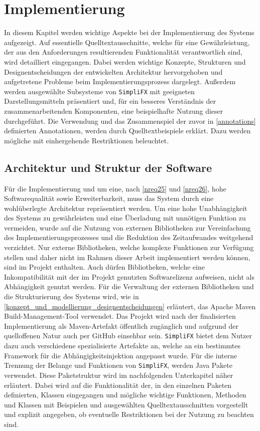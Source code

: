 \chapter{Implementierung}
\label{implementierung}
In diesem Kapitel werden wichtige Aspekte bei der Implementierung des Systems aufgezeigt. Auf essentielle Quelltextausschnitte, welche für eine Gewährleistung, der aus den Anforderungen resultierenden Funktionalität verantwortlich sind, wird detailliert eingegangen. Dabei werden wichtige Konzepte, Strukturen und Designentscheidungen der entwickelten Architektur hervorgehoben und aufgetretene Probleme beim Implementierungsprozess dargelegt. Außerdem werden ausgewählte Subsysteme von \texttt{SimpliFX} mit geeigneten Darstellungsmitteln präsentiert und, für ein besseres Verständnis der zusammenarbeitenden Komponenten, eine beispielhafte Nutzung dieser durchgeführt. Die Verwendung und das Zusammenspiel der zuvor in \autoref{annotations} definierten Annotationen, werden durch Quelltextbeispiele erklärt. Dazu werden mögliche mit einhergehende Restriktionen beleuchtet.
\section{Architektur und Struktur der Software}
\label{architektur}
Für die Implementierung und um eine, nach \autoref{nreq25} und \autoref{nreq26}, hohe Softwarequalität sowie Erweiterbarkeit, muss das System durch eine wohlüberlegte Architektur repräsentiert werden. Um eine hohe Unabhängigkeit des Systems zu gewährleisten und eine Überladung mit unnötigen Funktion zu vermeiden, wurde auf die Nutzung von externen Bibliotheken zur Vereinfachung des Implementierungsprozesses und die Reduktion des Zeitaufwandes weitgehend verzichtet. Nur externe Bibliotheken, welche komplexe Funktionen zur Verfügung stellen und daher nicht im Rahmen dieser Arbeit implementiert werden können, sind im Projekt enthalten. Auch dürfen Bibliotheken, welche eine Inkompatibilität mit der im Projekt genutzten Softwarelizenz aufweisen, nicht als Abhängigkeit genutzt werden. Für die Verwaltung der externen Bibliotheken und die Strukturierung des Systems wird, wie in \autoref{konzept_und_modellierung_designentscheidungen} erläutert, das Apache Maven Build-Management-Tool verwendet. Das Projekt wird nach der finalisierten Implementierung als Maven-Artefakt öffentlich zugänglich und aufgrund der quelloffenen Natur auch per GitHub einsehbar sein. \texttt{SimpliFX} bietet dem Nutzer dazu auch verschiedene spezialisierte Artefakte an, welche an ein bestimmtes Framework für die Abhängigkeitsinjektion angepasst wurde. Für die interne Trennung der Belange und Funktionen von \texttt{SimpliFX}, werden Java Pakete verwendet. Diese Paketstruktur wird im nachfolgenden Unterkapitel näher erläutert. Dabei wird auf die Funktionalität der, in den einzelnen Paketen definierten, Klassen eingegangen und mögliche wichtige Funktionen, Methoden und Klassen mit Beispielen und ausgewählten Quelltextausschnitten vorgestellt und explizit angegeben, ob eventuelle Restriktionen bei der Nutzung zu beachten sind.
